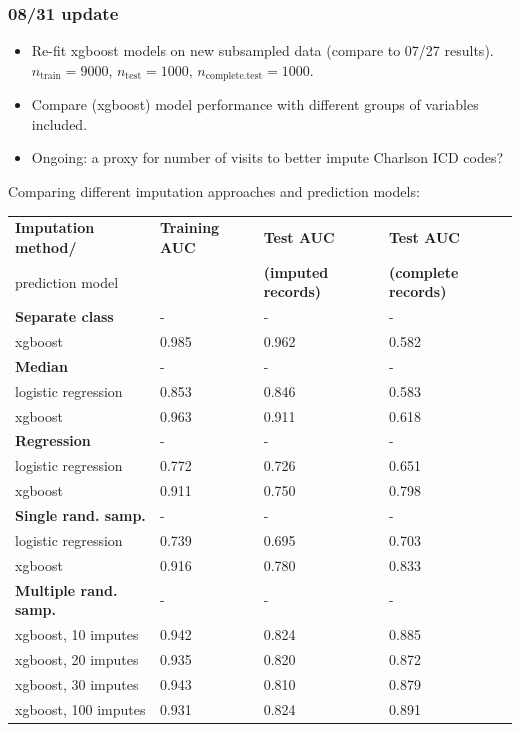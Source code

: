 \documentclass[12pt]{article}
\begin{document}
\pagebreak

\subsubsection*{08/31 update}

\begin{itemize}
  \item Re-fit xgboost models on new subsampled data (compare to 07/27 results). \\ $n_{\mathrm{train}}=9000$, $n_{\mathrm{test}}=1000$, $n_{\mathrm{complete.test}}=1000$.
  \item Compare (xgboost) model performance with different groups of variables included.
  \item Ongoing: a proxy for number of visits to better impute Charlson ICD codes?
\end{itemize}

Comparing different imputation approaches and prediction models:
\begin{center}
\begin{tabular}{|l|l|l|l|}
\hline
\textbf{Imputation method/} & \textbf{Training AUC} & \textbf{Test AUC} & \textbf{Test AUC} \\
prediction model& & \textbf{(imputed records)} & \textbf{(complete records)} \\ \hline
{\bf Separate class} & - & - & - \\ \hline
xgboost & 0.985 & 0.962 & 0.582 \\ \hline
{\bf Median} & - & - & - \\ \hline
logistic regression & 0.853 & 0.846 & 0.583 \\ \hline
xgboost & 0.963 & 0.911 & 0.618 \\ \hline
{\bf Regression} & - & - & - \\ \hline
logistic regression & 0.772 & 0.726 & 0.651 \\ \hline
xgboost & 0.911 & 0.750 & 0.798 \\ \hline %
{\bf Single rand. samp.} & - & - & - \\ \hline
logistic regression & 0.739 & 0.695 & 0.703 \\ \hline
xgboost & 0.916 & 0.780 & 0.833 \\ \hline
{\bf Multiple rand. samp.} & - & - & - \\ \hline
xgboost, 10 imputes & 0.942 & 0.824 & 0.885 \\ \hline
xgboost, 20 imputes & 0.935 & 0.820 & 0.872 \\ \hline
xgboost, 30 imputes & 0.943 & 0.810 & 0.879 \\ \hline
xgboost, 100 imputes & 0.931 & 0.824 & 0.891 \\ \hline %
\end{tabular}
\end{center}
\end{document}
